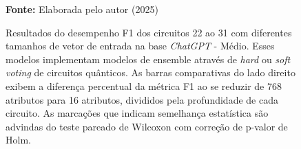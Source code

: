 \begin{figure}
\caption{Resultados do desempenho F1 dos circuitos 22 ao 31 com diferentes tamanhos de vetor de entrada na base \textit{ChatGPT} - Médio. Esses modelos implementam modelos de ensemble através de \textit{hard} ou \textit{soft voting} de circuitos quânticos. As barras comparativas do lado direito exibem a diferença percentual da métrica F1 ao se reduzir de 768 atributos para 16 atributos, divididos pela profundidade de cada circuito. As marcações que indicam semelhança estatística são advindas do teste pareado de Wilcoxon com correção de p-valor de Holm.}
\label{fig:n_features:medium:g7}
     \centering
    \centering
      \par\medskip\ABNTEXfontereduzida\selectfont\textbf{Fonte:} Elaborada pelo autor (2025) \par\medskip
\end{figure}